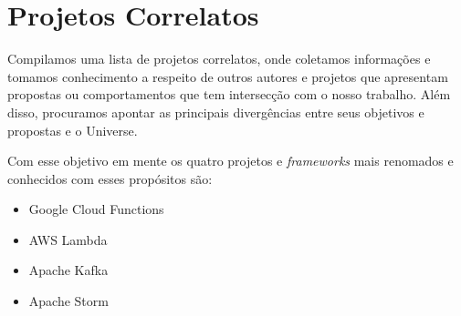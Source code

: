 \chapter{Projetos Correlatos}

Compilamos uma lista de projetos correlatos, onde coletamos informações e
tomamos conhecimento a respeito de outros autores e projetos que apresentam
propostas ou comportamentos que tem intersecção com o nosso trabalho. Além
disso, procuramos apontar as principais divergências entre seus objetivos e
propostas e o Universe.
\bigskip

Com esse objetivo em mente os quatro projetos e \textit{frameworks} mais
renomados e conhecidos com esses propósitos são:
\begin{itemize}
	\item Google Cloud Functions
	\item AWS Lambda
	\item Apache Kafka
	\item Apache Storm
\end{itemize}







